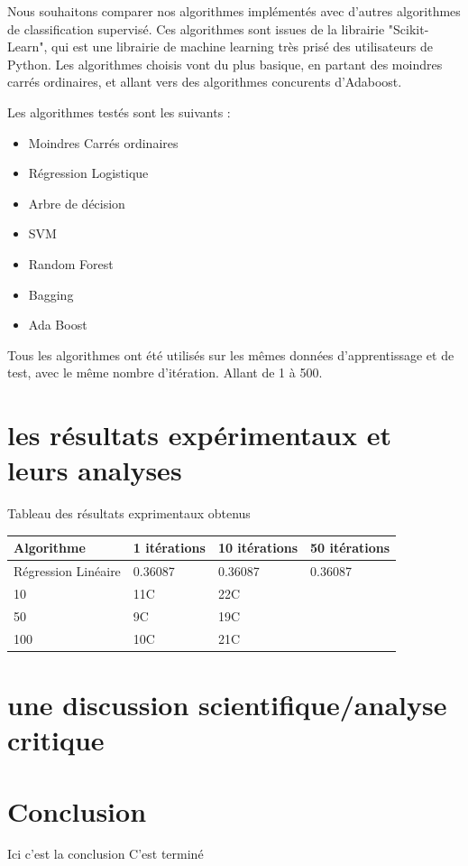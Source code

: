 \documentclass{article}
\begin{document}
Nous souhaitons comparer nos algorithmes implémentés avec d'autres algorithmes de classification supervisé. Ces algorithmes sont issues de la librairie "Scikit-Learn", qui est une librairie de machine learning très prisé des utilisateurs de Python. Les algorithmes choisis vont du plus basique, en partant des moindres carrés ordinaires, et allant vers des algorithmes concurents d'Adaboost.

Les algorithmes testés sont les suivants :
\begin{itemize}
    \item Moindres Carrés ordinaires 
    \item Régression Logistique
    \item Arbre de décision
    \item SVM
    \item Random Forest
    \item Bagging
    \item Ada Boost
\end{itemize}

Tous les algorithmes ont été utilisés sur les mêmes données d'apprentissage et de test, avec le même nombre d'itération. Allant de 1 à 500.





\section{les résultats expérimentaux et leurs analyses}
Tableau des résultats exprimentaux obtenus

\begin{center}
    \begin{tabular}{| l | l | l | l }
    \hline
    Algorithme & 1 itérations & 10 itérations & 50 itérations \\ \hline
    Régression Linéaire & 0.36087 &  0.36087 &  0.36087 
    \\ \hline
    10 & 11C & 22C  \\ \hline
    50 & 9C & 19C  \\ \hline
    100 & 10C & 21C  \\
    \hline
    \end{tabular}
\end{center}


\section{une discussion scientifique/analyse critique}

\section{Conclusion}
Ici c'est la conclusion 
C'est terminé



\end{document}
